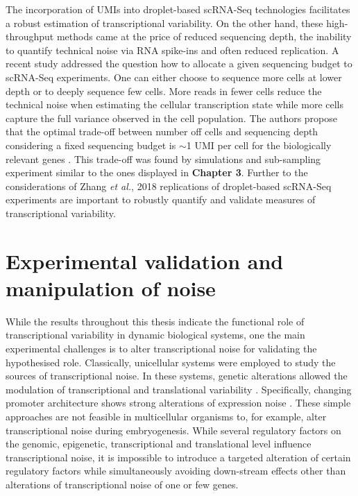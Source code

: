 The incorporation of UMIs into droplet-based scRNA-Seq technologies facilitates a robust estimation of transcriptional variability. On the other hand, these high-throughput methods came at the price of reduced sequencing depth, the inability to quantify technical noise via RNA spike-ins and often reduced replication. A recent study addressed the question how to allocate a given sequencing budget to scRNA-Seq experiments. One can either choose to sequence more cells at lower depth or to  deeply sequence few cells. More reads in fewer cells reduce the technical noise when estimating the cellular transcription state while more cells capture the full variance observed in the cell population. The authors propose that the optimal trade-off between number off cells and sequencing depth considering a fixed sequencing budget is $\sim$1 UMI per cell for the biologically relevant genes \citep{Zhang2018}. This trade-off was found by simulations and sub-sampling experiment similar to the ones displayed in \textbf{Chapter 3}. Further to the considerations of Zhang \emph{et al.}, 2018 replications of droplet-based scRNA-Seq experiments are important to robustly quantify and validate measures of transcriptional variability. \\

\section{Experimental validation and manipulation of noise}

While the results throughout this thesis indicate the functional role of transcriptional variability in dynamic biological systems, one the main experimental challenges is to alter transcriptional noise for validating the hypothesised role. Classically, unicellular systems were employed to study the sources of transcriptional noise. In these systems, genetic alterations allowed the modulation of transcriptional and translational variability \cite{Raser2004, Raser2005, Ozbudak2002, Hornung2012}. Specifically, changing promoter architecture shows strong alterations of expression noise \cite{Jones2014, Sharon2014}. These simple approaches are not feasible in multicellular organisms to, for example, alter transcriptional noise during embryogenesis. While several regulatory factors on the genomic, epigenetic, transcriptional and translational level influence transcriptional noise, it is impossible to introduce a targeted alteration of certain regulatory factors while simultaneously avoiding down-stream effects other than alterations of transcriptional noise of one or few genes.\\

